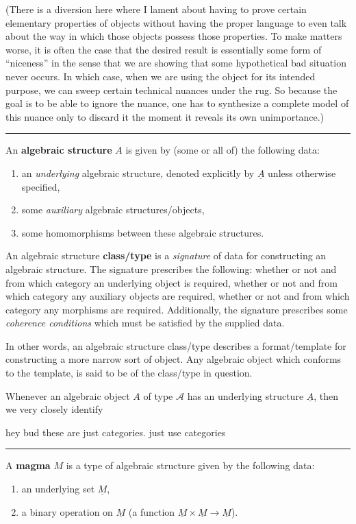 \documentclass[12pt]{article}
\newcommand{\keyword}[1]{\textbf{#1}}
\newcommand{\sepline}{\rule{\textwidth}{0.4pt}}
\theoremstyle{definition}
\newcommand{\<}{\left\langle}
\renewcommand{\>}{\right\rangle}
\newcommand{\udl}{\underline}
\renewcommand{\_}[1]{{_{#1}}}
\begin{document}
(There is a diversion here where I lament about having to prove certain elementary properties of objects without having the proper language to even talk about the way in which those objects possess those properties.
To make matters worse, it is often the case that the desired result is essentially some form of ``niceness'' in the sense that we are showing that some hypothetical bad situation never occurs. In which case, when we are using the object for its intended purpose, we can sweep certain technical nuances under the rug.
So because the goal is to be able to ignore the nuance, one has to synthesize a complete model of this nuance only to discard it the moment it reveals its own unimportance.)

\sepline

An \keyword{algebraic structure} $A$ is given by (some or all of) the following data:
\begin{enumerate}[(1)]
    \item an \emph{underlying} algebraic structure, denoted explicitly by $\udl{A}$ unless otherwise specified,
    \item some \emph{auxiliary} algebraic structures/objects,
    \item some homomorphisms between these algebraic structures.
\end{enumerate}

An algebraic structure \keyword{class/type} is a \emph{signature} of data for constructing an algebraic structure.
The signature prescribes the following: whether or not and from which category an underlying object is required, whether or not and from which category any auxiliary objects are required, whether or not and from which category any morphisms are required.
Additionally, the signature prescribes some \emph{coherence conditions} which must be satisfied by the supplied data.

In other words, an algebraic structure class/type describes a format/template for constructing a more narrow sort of object.
Any algebraic object which conforms to the template, is said to be of the class/type in question.

Whenever an algebraic object $A$ of type $\mathcal{A}$ has an underlying structure $\udl{A}$, then we very closely identify 

hey bud these are just categories. just use categories

\sepline

A \keyword{magma} $M$ is a type of algebraic structure given by the following data:
\begin{enumerate}[(1)]
    \item an underlying set $\udl{M}$,
    \item a binary operation on $\udl{M}$ (a function $\udl{M} \times \udl{M} \to \udl{M}$).
\end{enumerate}
\end{document}
